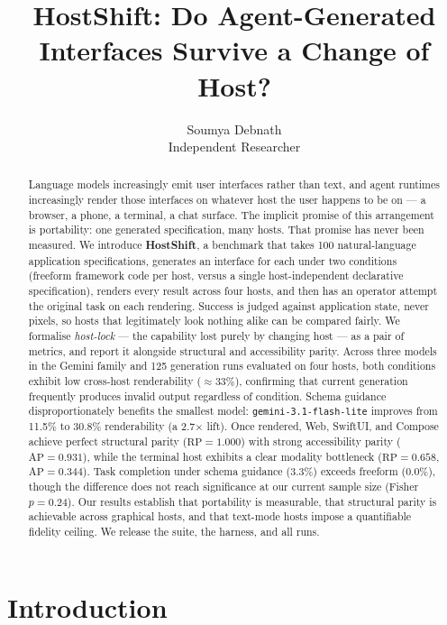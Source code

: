 \documentclass{article}
\title{HostShift: Do Agent-Generated Interfaces Survive a Change of Host?}
\author{%
  Soumya Debnath \\
  Independent Researcher
}
\begin{document}
\maketitle

\begin{abstract}
Language models increasingly emit user interfaces rather than text, and agent
runtimes increasingly render those interfaces on whatever host the user happens
to be on --- a browser, a phone, a terminal, a chat surface. The implicit promise
of this arrangement is portability: one generated specification, many hosts.
That promise has never been measured. We introduce \textbf{HostShift}, a
benchmark that takes 100 natural-language application specifications,
generates an interface for each under two conditions (freeform framework code
per host, versus a single host-independent declarative specification), renders
every result across four hosts, and then has an operator attempt
the original task on each rendering. Success is judged against application
state, never pixels, so hosts that legitimately look nothing alike can be
compared fairly. We formalise \emph{host-lock} --- the capability lost purely by
changing host --- as a pair of metrics, and report it alongside structural and
accessibility parity. Across three models in the Gemini family and 125 generation runs evaluated on four hosts, both conditions exhibit low cross-host renderability ($\approx$33\%), confirming that current generation frequently produces invalid output regardless of condition. Schema guidance disproportionately benefits the smallest model: \texttt{gemini-3.1-flash-lite} improves from 11.5\% to 30.8\% renderability (a 2.7$\times$ lift). Once rendered, Web, SwiftUI, and Compose achieve perfect structural parity ($\mathrm{RP}=1.000$) with strong accessibility parity ($\mathrm{AP}=0.931$), while the terminal host exhibits a clear modality bottleneck ($\mathrm{RP}=0.658$, $\mathrm{AP}=0.344$). Task completion under schema guidance (3.3\%) exceeds freeform (0.0\%), though the difference does not reach significance at our current sample size (Fisher $p=0.24$). Our results establish that portability is measurable, that structural parity is achievable across graphical hosts, and that text-mode hosts impose a quantifiable fidelity ceiling. We release the suite, the harness, and all runs.
\end{abstract}

\section{Introduction}
\end{document}
